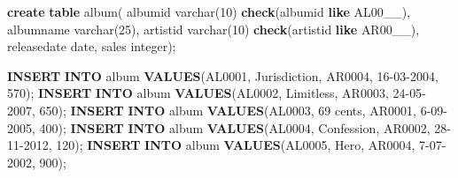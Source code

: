 \documentclass[
]{article}
\newenvironment{Shaded}{}{}
\newcommand{\DataTypeTok}[1]{\textcolor[rgb]{0.56,0.13,0.00}{#1}}
\newcommand{\DecValTok}[1]{\textcolor[rgb]{0.25,0.63,0.44}{#1}}
\newcommand{\KeywordTok}[1]{\textcolor[rgb]{0.00,0.44,0.13}{\textbf{#1}}}
\newcommand{\NormalTok}[1]{#1}
\newcommand{\StringTok}[1]{\textcolor[rgb]{0.25,0.44,0.63}{#1}}
\begin{document}
\begin{Shaded}
\begin{Highlighting}[]
\KeywordTok{create} \KeywordTok{table}\NormalTok{ album(}
\NormalTok{   albumid }\DataTypeTok{varchar}\NormalTok{(}\DecValTok{10}\NormalTok{) }\KeywordTok{check}\NormalTok{(albumid }\KeywordTok{like} \StringTok{\textquotesingle{}AL00\_\_\textquotesingle{}}\NormalTok{),}
\NormalTok{   albumname }\DataTypeTok{varchar}\NormalTok{(}\DecValTok{25}\NormalTok{),}
\NormalTok{   artistid }\DataTypeTok{varchar}\NormalTok{(}\DecValTok{10}\NormalTok{) }\KeywordTok{check}\NormalTok{(artistid }\KeywordTok{like} \StringTok{\textquotesingle{}AR00\_\_\textquotesingle{}}\NormalTok{),}
\NormalTok{   releasedate }\DataTypeTok{date}\NormalTok{,}
\NormalTok{   sales }\DataTypeTok{integer}\NormalTok{);}

\KeywordTok{INSERT} \KeywordTok{INTO}\NormalTok{ album }\KeywordTok{VALUES}\NormalTok{(}\StringTok{\textquotesingle{}AL0001\textquotesingle{}}\NormalTok{, }\StringTok{\textquotesingle{}Jurisdiction\textquotesingle{}}\NormalTok{, }\StringTok{\textquotesingle{}AR0004\textquotesingle{}}\NormalTok{, }\StringTok{\textquotesingle{}16{-}03{-}2004\textquotesingle{}}\NormalTok{, }\DecValTok{570}\NormalTok{);}
\KeywordTok{INSERT} \KeywordTok{INTO}\NormalTok{ album }\KeywordTok{VALUES}\NormalTok{(}\StringTok{\textquotesingle{}AL0002\textquotesingle{}}\NormalTok{, }\StringTok{\textquotesingle{}Limitless\textquotesingle{}}\NormalTok{, }\StringTok{\textquotesingle{}AR0003\textquotesingle{}}\NormalTok{, }\StringTok{\textquotesingle{}24{-}05{-}2007\textquotesingle{}}\NormalTok{, }\DecValTok{650}\NormalTok{);}
\KeywordTok{INSERT} \KeywordTok{INTO}\NormalTok{ album }\KeywordTok{VALUES}\NormalTok{(}\StringTok{\textquotesingle{}AL0003\textquotesingle{}}\NormalTok{, }\StringTok{\textquotesingle{}69 cents\textquotesingle{}}\NormalTok{, }\StringTok{\textquotesingle{}AR0001\textquotesingle{}}\NormalTok{, }\StringTok{\textquotesingle{}6{-}09{-}2005\textquotesingle{}}\NormalTok{, }\DecValTok{400}\NormalTok{);}
\KeywordTok{INSERT} \KeywordTok{INTO}\NormalTok{ album }\KeywordTok{VALUES}\NormalTok{(}\StringTok{\textquotesingle{}AL0004\textquotesingle{}}\NormalTok{, }\StringTok{\textquotesingle{}Confession\textquotesingle{}}\NormalTok{, }\StringTok{\textquotesingle{}AR0002\textquotesingle{}}\NormalTok{, }\StringTok{\textquotesingle{}28{-}11{-}2012\textquotesingle{}}\NormalTok{, }\DecValTok{120}\NormalTok{);}
\KeywordTok{INSERT} \KeywordTok{INTO}\NormalTok{ album }\KeywordTok{VALUES}\NormalTok{(}\StringTok{\textquotesingle{}AL0005\textquotesingle{}}\NormalTok{, }\StringTok{\textquotesingle{}Hero\textquotesingle{}}\NormalTok{, }\StringTok{\textquotesingle{}AR0004\textquotesingle{}}\NormalTok{, }\StringTok{\textquotesingle{}7{-}07{-}2002\textquotesingle{}}\NormalTok{, }\DecValTok{900}\NormalTok{);}


\end{Highlighting}
\end{Shaded}
\end{document}

